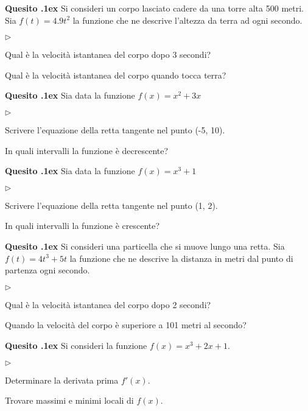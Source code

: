 \documentclass[11pt,twoside,a4paper]{article}
\newcommand{\mylabel}[1]{#1\hfill}
\renewenvironment{itemize}
  {\begin{list}{$\triangleright$}{%
   \setlength{\parskip}{0mm}
   \setlength{\topsep}{.4\baselineskip}
   \setlength{\rightmargin}{0mm}
   \setlength{\listparindent}{0mm}
   \setlength{\itemindent}{0mm}
   \setlength{\labelwidth}{2ex}
   \setlength{\itemsep}{.4\baselineskip}
   \setlength{\parsep}{0mm}
   \setlength{\partopsep}{0mm}
   \setlength{\labelsep}{1ex}
   \setlength{\leftmargin}{\labelwidth+\labelsep}
   \let\makelabel\mylabel}}{%
   \end{list}\vspace*{-1.3mm}}
\newcounter{quesito}
\newenvironment{question}{\bigskip\addtocounter{quesito}{1}\bigskip\bigskip\par\textbf{Quesito \thequesito.\kern1ex}}{\vspace{\parskip}}
\begin{document}
\begin{question}
Si consideri un corpo lasciato cadere da una torre alta 500 metri. Sia  $f(t) = 4.9 t^2$ la funzione che ne descrive l'altezza da terra ad ogni secondo.
\begin{itemize}
\item[1.] Qual è la velocità istantanea del corpo dopo 3 secondi?
\item[2.] Qual è la velocità istantanea del corpo quando tocca terra?
\end{itemize}
\end{question}

\begin{question}
Sia data la funzione $f(x) = x^2 + 3 x$
\begin{itemize}
\item[1.] Scrivere l'equazione della retta tangente nel punto (-5, 10).
\item[2.] In quali intervalli la funzione è decrescente?
\end{itemize}
\end{question}

\begin{question}
Sia data la funzione $f(x) = x^3 + 1$
\begin{itemize}
\item[1.] Scrivere l'equazione della retta tangente nel punto (1, 2).
\item[2.] In quali intervalli la funzione è crescente?
\end{itemize}
\end{question}

\begin{question}
Si consideri una particella che si muove lungo una retta. Sia $f(t) = 4 t^3 + 5 t$ la funzione che ne descrive la distanza in metri dal punto di partenza ogni secondo.
\begin{itemize}
\item[1.] Qual è la velocità istantanea del corpo dopo 2 secondi?
\item[2.] Quando la velocità del corpo è superiore a 101 metri al secondo?
\end{itemize}
\end{question}

\begin{question}
Si consideri la funzione $f(x) = x^3 + 2x + 1$.
\begin{itemize}
\item[1.] Determinare la derivata prima $f'(x)$.
\item[2.] Trovare massimi e minimi locali di $f(x)$.
\end{itemize}
\end{question}
\end{document}
